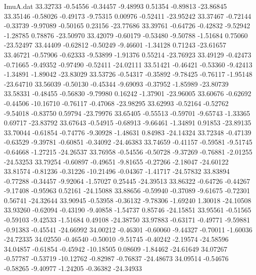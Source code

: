 \begin{filecontents}{ImuA.dat}
  33.32733   -0.54556   -0.34457   -9.48993    0.51354   -0.89813  -23.86845
  33.35146   -0.58026   -0.49173   -9.75315    0.00976   -0.52411  -23.95242
  33.37467   -0.72144   -0.33739   -9.97089   -0.50165    0.23156  -23.77686
  33.39761   -0.64726   -0.42832   -9.52942   -1.28785    0.78876  -23.50970
  33.42079   -0.60179   -0.53480   -9.50788   -1.51684    0.75060  -23.52497
  33.44409   -0.62812   -0.50249   -9.46601   -1.34128    0.71243  -23.61657
  33.46721   -0.57906   -0.62333   -9.53899   -1.91376    0.55214  -23.76923
  33.49129   -0.42473   -0.71665   -9.49352   -0.97490   -0.52411  -24.02111
  33.51421   -0.46421   -0.53360   -9.42413   -1.34891   -1.89042  -23.83029
  33.53726   -0.54317   -0.35892   -9.78425   -0.76117   -1.95148  -23.64710
  33.56039   -0.50130   -0.45344   -9.69093   -0.37952   -1.85989  -23.80739
  33.58331   -0.48455   -0.56830   -9.79980    0.16242   -1.37901  -23.96005
  33.60676   -0.62692   -0.44506  -10.16710   -0.76117   -0.47068  -23.98295
  33.62993   -0.52164   -0.52762   -9.54018   -0.83750    0.59794  -23.79976
  33.65405   -0.55513   -0.59701   -9.65743   -1.33365    0.69717  -23.83792
  33.67643   -0.54915   -0.68913   -9.66461   -1.34891    0.91853  -23.89135
  33.70044   -0.61854   -0.74776   -9.30928   -1.48631    0.84983  -24.14324
  33.72348   -0.47139   -0.63529   -9.39781   -0.60851   -0.34092  -24.46383
  33.74659   -0.41157   -0.59581   -9.51745   -0.64668   -1.27215  -24.26537
  33.76958   -0.54556   -0.50728   -9.37269   -0.76881   -2.01255  -24.53253
  33.79254   -0.60897   -0.49651   -9.81655   -0.27266   -2.18047  -24.60122
  33.81574   -0.81236   -0.31226  -10.21496   -0.04367   -1.41717  -24.57832
  33.83894   -0.77288   -0.34457   -9.92064   -1.57027    0.25445  -24.39513
  33.86322   -0.64726   -0.44267   -9.17408   -0.95963    0.52161  -24.15088
  33.88656   -0.59940   -0.37089   -9.61675   -0.72301    0.56741  -24.32644
  33.90945   -0.53958   -0.36132   -9.78306   -1.69240    1.30018  -24.10508
  33.93260   -0.62094   -0.43190   -9.40858   -1.54737    0.85746  -24.15851
  33.95561   -0.51565   -0.59103   -9.42533   -1.51684    0.49108  -24.38750
  33.97883   -0.63171   -0.49771   -9.59881   -0.91383   -0.45541  -24.66992
  34.00212   -0.46301   -0.60060   -9.44327   -0.70011   -1.60036  -24.72335
  34.02550   -0.46540   -0.50010   -9.51745   -0.40242   -2.19574  -24.58596
  34.04857   -0.61854   -0.45942  -10.18505    0.08609   -1.84462  -24.61649
  34.07267   -0.57787   -0.53719  -10.12762   -0.82987   -0.76837  -24.48673
  34.09514   -0.54676   -0.58265   -9.40977   -1.24205   -0.36382  -24.34933

\end{filecontents}
